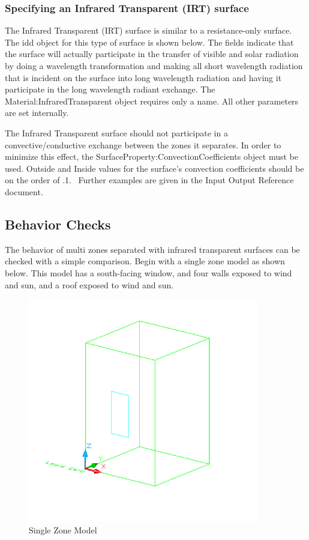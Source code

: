 \subsubsection{Specifying an Infrared Transparent (IRT) surface}\label{specifying-an-infrared-transparent-irt-surface}

The Infrared Transparent (IRT) surface is similar to a resistance-only surface. The idd object for this type of surface is shown below. The fields indicate that the surface will actually participate in the transfer of visible and solar radiation by doing a wavelength transformation and making all short wavelength radiation that is incident on the surface into long wavelength radiation and having it participate in the long wavelength radiant exchange. The Material:InfraredTransparent object requires only a name. All other parameters are set internally.

The Infrared Transparent surface should not participate in a convective/conductive exchange between the zones it separates. In order to minimize this effect, the SurfaceProperty:ConvectionCoefficients object must be used. Outside and Inside values for the surface's convection coefficients should be on the order of .1.~ Further examples are given in the Input Output Reference document.

\subsection{Behavior Checks}\label{behavior-checks}

The behavior of multi zones separated with infrared transparent surfaces can be checked with a simple comparison. Begin with a single zone model as shown below. This model has a south-facing window, and four walls exposed to wind and sun, and a roof exposed to wind and sun.

\begin{figure}[hbtp] %
\centering
\includegraphics[width=0.9\textwidth, height=0.9\textheight, keepaspectratio=true]{media/image396.png}
\caption{Single Zone Model \protect \label{fig:single-zone-model}}
\end{figure}

